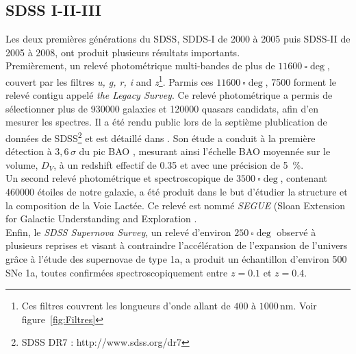 \subsection{SDSS I-II-III}
Les deux premières générations du SDSS, SDDS-I de 2000 à 2005 puis SDSS-II de 2005 à 2008, ont produit plusieurs résultats importants.\\
Premièrement, un relevé photométrique multi-bandes de plus de $\SI{11600}{\square\deg}$, couvert par les filtres \emph{u, g, r, i} and \emph{z}\footnote{Ces filtres couvrent les longueurs d'onde allant de $400$ à $1000\,\mathrm{nm}$. Voir figure~\ref{fig:Filtres}}. Parmis ces $\SI{11600}{\square\deg}$, \num{7500} forment le relevé contigu appelé \emph{the Legacy Survey}. Ce relevé photométrique a permis de sélectionner plus de \num{930000} galaxies et \num{120000} quasars candidats, afin d'en mesurer les spectres. Il a été rendu public lors de la septième plublication de données de SDSS\footnote{SDSS DR7 : http://www.sdss.org/dr7} et est détaillé dans \textcite{Abazajian2008}. Son étude a conduit à la première détection à $3,6\,\sigma$ du pic BAO \autocite{Eisenstein2005}, mesurant ainsi l'échelle BAO moyennée sur le volume, $D_V$, à un redshift effectif de \num{0,35} et avec une précision de \SI{5}{\percent}. \\
Un second relevé photométrique et spectroscopique de $\SI{3500}{\square\deg}$, contenant \num{460000} étoiles de notre galaxie, a été produit dans le but d'étudier la structure et la composition de la Voie Lactée. Ce relevé est nommé \emph{SEGUE} (Sloan Extension for Galactic Understanding and Exploration \autocite{Collaboration2009}.\\
Enfin, le \emph{SDSS Supernova Survey}, un relevé d'environ $\SI{250}{\square\deg}$ observé à plusieurs reprises et visant à contraindre l'accélération de l'expansion de l'univers grâce à l'étude des supernovae de type 1a, a produit un échantillon d'environ 500 SNe 1a, toutes confirmées spectroscopiquement entre $z=\num{0,1}$ et $z=\num{0,4}$.

